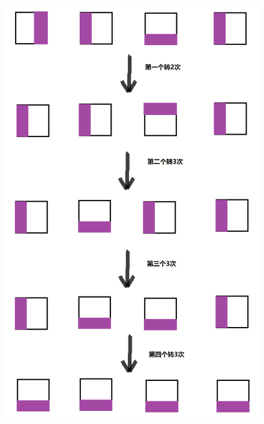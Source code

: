 \begin{figure}[H]
    \centering
    \includegraphics[scale=0.3]{./src/Problem-F-2.png}
\end{figure}